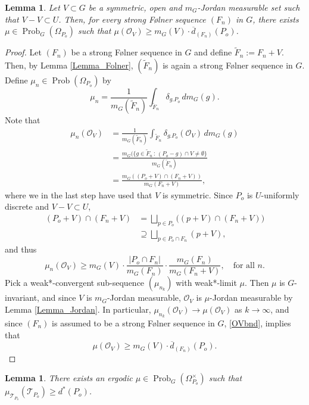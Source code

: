 \documentclass[12pt,reqno,a4paper]{amsart}
\numberwithin{equation}{section}
\newcommand{\cO}{\mathcal{O}}
\newcommand{\cT}{\mathcal{T}}
\newcommand{\ra}{\rightarrow}
\DeclareMathOperator{\Prob}{Prob}
\theoremstyle{theorem}
\newtheorem{lemma}[theorem]{Lemma}
\theoremstyle{task}
\theoremstyle{definition}
\begin{document}
\begin{lemma}
\label{lemma1}
Let $V \subset G$ be a symmetric, open and $m_G$-Jordan measurable set such that $V-V \subset U$. Then, for every strong F\o lner sequence $(F_n)$ in $G$, there exists $\mu \in \Prob_G(\Omega_{P_o})$ such that $\mu(\cO_V) \geq m_G(V) \cdot \overline{d}_{(F_n)}(P_o)$.
\end{lemma}

\begin{proof}
Let $(F_n)$ be a strong F\o lner sequence in $G$ and define $\widetilde{F}_n := F_n + V$. Then, by Lemma \ref{Lemma_Folner}, $(\widetilde{F}_n)$ is again a strong F\o lner sequence in $G$. Define $\mu_n \in \Prob(\Omega_{P_o})$ by
\[
\mu_n = \frac{1}{m_G(\widetilde{F}_n)} \int_{\widetilde{F}_n} \delta_{g.P_o} \, dm_G(g).
\]
Note that
\begin{align*}
\mu_n(\cO_V)
&= \frac{1}{m_G(\widetilde{F}_n)} \int_{\widetilde{F}_n} \delta_{g.P_o}(\cO_V) \, dm_G(g) \\[0.2cm]
&= \frac{m_G(\{ g \in \widetilde{F}_n \, : \, (P_o - g) \cap V \neq \emptyset\}}{m_G(\widetilde{F}_n)} \\[0.2cm]
&= \frac{m_G((P_o + V) \cap (F_n+V))}{m_G(F_n +V)},
\end{align*}
where we in the last step have used that $V$ is symmetric. Since $P_o$ is $U$-uniformly discrete and $V-V \subset U$, 
\begin{align*}
(P_o + V) \cap (F_n+V)
&= \bigsqcup_{p \in P_o} \big((p + V) \cap (F_{n} + V)\big) \\[0.2cm]
&\supseteq \bigsqcup_{p \in P_o \cap F_{n}} (p+V),
\end{align*}
and thus
\begin{equation}
\label{OVbnd}
\mu_n(\cO_V) \geq m_G(V) \cdot \frac{|P_o \cap F_n|}{m_G(F_n)} \cdot \frac{m_G(F_n)}{m_G(F_n+V)}, \quad \textrm{for all $n$}.
\end{equation}
Pick a weak*-convergent sub-sequence $(\mu_{n_k})$ with weak*-limit $\mu$. Then $\mu$ is $G$-invariant, and since $V$ is $m_G$-Jordan measurable, $\cO_V$ is $\mu$-Jordan measurable by Lemma \ref{Lemma_Jordan}. In particular, $\mu_{n_k}(\cO_V) \ra \mu(\cO_V)$ as $k \ra \infty$, and since $(F_n)$ is assumed to be a strong F\o lner sequence in $G$, \eqref{OVbnd}, implies that
\[
\mu(\cO_V) \geq m_G(V) \cdot \overline{d}_{(F_n)}(P_o).
\]
\end{proof}

\begin{lemma}
\label{lemma2}
There exists an ergodic $\mu \in \Prob_G(\Omega_{P_o}^{\times})$ such that 
$\mu_{\cT_{P_o}}(\cT_{P_o}) \geq d^*(P_o)$.
\end{lemma}
\end{document}
